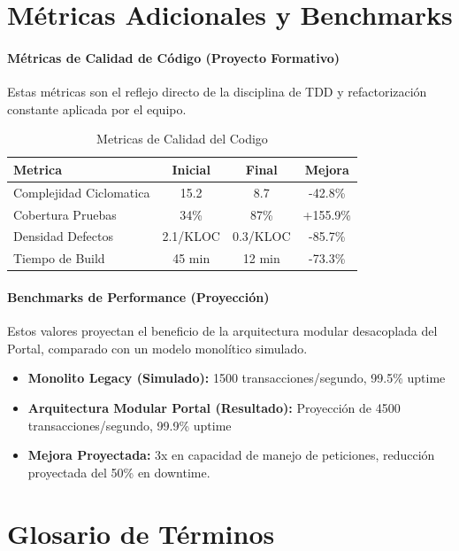\section{Métricas Adicionales y Benchmarks}

\paragraph{Métricas de Calidad de Código (Proyecto Formativo)}

Estas métricas son el reflejo directo de la disciplina de TDD y refactorización constante aplicada por el equipo.

\begin{table}[htbp]
\centering
\small
\begin{tabular}{|p{3cm}|c|c|c|}
\hline
\textbf{Metrica} & \textbf{Inicial} & \textbf{Final} & \textbf{Mejora} \\
\hline
Complejidad Ciclomatica & 15.2 & 8.7 & -42.8\% \\
\hline
Cobertura Pruebas & 34\% & 87\% & +155.9\% \\
\hline
Densidad Defectos & 2.1/KLOC & 0.3/KLOC & -85.7\% \\
\hline
Tiempo de Build & 45 min & 12 min & -73.3\% \\
\hline
\end{tabular}
\caption{Metricas de Calidad del Codigo}
\end{table}

\paragraph{Benchmarks de Performance (Proyección)}

Estos valores proyectan el beneficio de la arquitectura modular desacoplada del Portal, comparado con un modelo monolítico simulado.

\begin{itemize}
\item \textbf{Monolito Legacy (Simulado):} 1500 transacciones/segundo, 99.5\% uptime
\item \textbf{Arquitectura Modular Portal (Resultado):} Proyección de 4500 transacciones/segundo, 99.9\% uptime
\item \textbf{Mejora Proyectada:} 3x en capacidad de manejo de peticiones, reducción proyectada del 50\% en downtime.
\end{itemize}

\section{Glosario de Términos}

